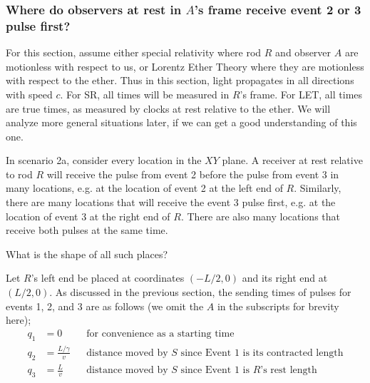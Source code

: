 \documentclass[a4paper]{article}
\theoremstyle{plain}
\theoremstyle{definition}
\begin{document}
\subsubsection{Where do observers at rest in $A$'s frame receive event 2 or 3 pulse first?}
\label{sec:scen2a-restpulsefirst}

For this section, assume either special relativity where rod $R$ and
observer $A$ are motionless with respect to us, or Lorentz Ether
Theory where they are motionless with respect to the ether.  Thus in
this section, light propagates in all directions with speed $c$.  For
SR, all times will be measured in $R$'s frame.  For LET, all times are
true times, as measured by clocks at rest relative to the ether.  We
will analyze more general situations later, if we can get a good
understanding of this one.

In scenario 2a, consider every location in the $XY$ plane.  A receiver
at rest relative to rod $R$ will receive the pulse from event 2 before
the pulse from event 3 in many locations, e.g. at the location of
event 2 at the left end of $R$.  Similarly, there are many locations
that will receive the event 3 pulse first, e.g. at the location of
event 3 at the right end of $R$.  There are also many locations that
receive both pulses at the same time.

What is the shape of all such places?

Let $R$'s left end be placed at coordinates $(-L/2,0)$ and its right
end at $(L/2,0)$.
As discussed in the previous section, the sending times of pulses for
events 1, 2, and 3 are as follows (we omit the $A$ in the subscripts
for brevity here);
\begin{align*}
q_1 & = 0 & & \text{for convenience as a starting time} \\
q_2 & = \frac{L/\gamma}{v} & & \text{distance moved by $S$ since Event 1 is its contracted length} \\
q_3 & = \frac{L}{v} & & \text{distance moved by $S$ since Event 1 is $R$'s rest length}
\end{align*}
\end{document}
